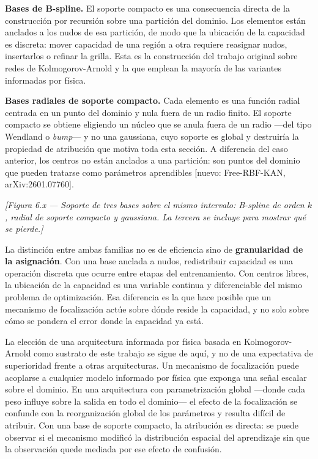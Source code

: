 \textbf{Bases de B-spline.} El soporte compacto es una consecuencia directa de la construcción por recursión sobre una partición del dominio. Los elementos están anclados a los nudos de esa partición, de modo que la ubicación de la capacidad es discreta: mover capacidad de una región a otra requiere reasignar nudos, insertarlos o refinar la grilla. Esta es la construcción del trabajo original sobre redes de Kolmogorov-Arnold \cite{liu2024kan} y la que emplean la mayoría de las variantes informadas por física.

\textbf{Bases radiales de soporte compacto.} Cada elemento es una función radial centrada en un punto del dominio y nula fuera de un radio finito. El soporte compacto se obtiene eligiendo un núcleo que se anula fuera de un radio —del tipo Wendland o \textit{bump}— y no una gaussiana, cuyo soporte es global y destruiría la propiedad de atribución que motiva toda esta sección. A diferencia del caso anterior, los centros no están anclados a una partición: son puntos del dominio que pueden tratarse como parámetros aprendibles [nuevo: Free-RBF-KAN, arXiv:2601.07760].


\textit{[Figura 6.x — Soporte de tres bases sobre el mismo intervalo: B-spline de orden $k$, radial de soporte compacto y gaussiana. La tercera se incluye para mostrar qué se pierde.]}

La distinción entre ambas familias no es de eficiencia sino de \textbf{granularidad de la asignación}. Con una base anclada a nudos, redistribuir capacidad es una operación discreta que ocurre entre etapas del entrenamiento. Con centros libres, la ubicación de la capacidad es una variable continua y diferenciable del mismo problema de optimización. Esa diferencia es la que hace posible que un mecanismo de focalización actúe sobre dónde reside la capacidad, y no solo sobre cómo se pondera el error donde la capacidad ya está.

La elección de una arquitectura informada por física basada en Kolmogorov-Arnold como sustrato de este trabajo se sigue de aquí, y no de una expectativa de superioridad frente a otras arquitecturas. Un mecanismo de focalización puede acoplarse a cualquier modelo informado por física que exponga una señal escalar sobre el dominio. En una arquitectura con parametrización global —donde cada peso influye sobre la salida en todo el dominio— el efecto de la focalización se confunde con la reorganización global de los parámetros y resulta difícil de atribuir. Con una base de soporte compacto, la atribución es directa: se puede observar si el mecanismo modificó la distribución espacial del aprendizaje sin que la observación quede mediada por ese efecto de confusión.

